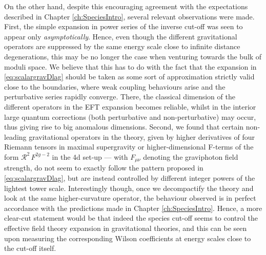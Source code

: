 On the other hand, despite this encouraging agreement with the expectations described in Chapter \ref{ch:SpeciesIntro}, several relevant observations were made. First, the simple expansion in power series of the inverse cut-off was seen to appear only \emph{asymptotically}. Hence, even though the different gravitational operators are suppressed by the same energy scale close to infinite distance degenerations, this may be no longer the case when venturing towards the bulk of moduli space. We believe that this has to do with the fact that the expansion in \eqref{eq:scalargravDlag} should be taken as some sort of approximation strictly valid close to the boundaries, where weak coupling behaviours arise and the perturbative series rapidly converge. There, the classical dimension of the different operators in the EFT expansion becomes reliable, whilst in the interior large quantum corrections (both perturbative and non-perturbative) may occur, thus giving rise to big anomalous dimensions. Second, we found that certain non-leading gravitational operators in the theory, given by higher derivatives of four Riemann tensors in maximal supergravity \cite{Green:2010kv,Green:2010wi} or higher-dimensional F-terms of the form $\mathcal{R}^2\, F^{2g-2}$ in the 4d set-up \cite{Bershadsky:1993ta, Bershadsky:1993cx,Antoniadis:1993ze,Antoniadis:1995zn}  --- with $F_{\mu \nu}$ denoting the graviphoton field strength, do not seem to exactly follow the pattern proposed in \eqref{eq:scalargravDlag}, but are instead controlled by different integer powers of the lightest tower scale. Interestingly though, once we decompactify the theory and look at the same higher-curvature operator, the behaviour observed is in perfect accordance with the predictions made in Chapter \ref{ch:SpeciesIntro}. Hence, a more clear-cut statement would be that indeed the species cut-off seems to control the effective field theory expansion in gravitational theories, and this can be seen upon measuring the corresponding Wilson coefficients at energy scales close to the cut-off itself. %

